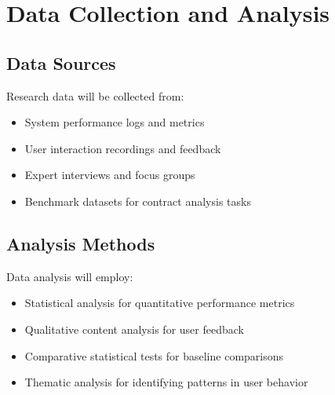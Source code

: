 \section{Data Collection and Analysis}

\subsection{Data Sources}
Research data will be collected from:
\begin{itemize}
    \item System performance logs and metrics
    \item User interaction recordings and feedback
    \item Expert interviews and focus groups
    \item Benchmark datasets for contract analysis tasks
\end{itemize}

\subsection{Analysis Methods}
Data analysis will employ:
\begin{itemize}
    \item Statistical analysis for quantitative performance metrics
    \item Qualitative content analysis for user feedback
    \item Comparative statistical tests for baseline comparisons
    \item Thematic analysis for identifying patterns in user behavior
\end{itemize}
